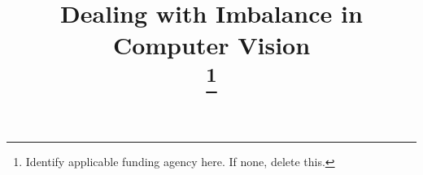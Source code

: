 \documentclass[Dealing with Imbalance in Computer Vision]{IEEEtran}
\begin{document}
\title{Dealing with Imbalance in Computer Vision\\
\thanks{Identify applicable funding agency here. If none, delete this.}
}

\author{
}

\maketitle
\end{document}
